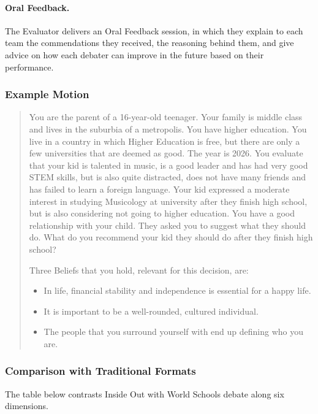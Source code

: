 \documentclass[12pt]{article}
\begin{document}
\paragraph{Oral Feedback.} The Evaluator delivers an Oral Feedback session, in which they explain to each team the commendations they received, the reasoning behind them, and give advice on how each debater can improve in the future based on their performance.

\subsubsection{Example Motion}

\begin{quote}
You are the parent of a 16-year-old teenager. Your family is middle class and lives in the suburbia of a metropolis. You have higher education. You live in a country in which Higher Education is free, but there are only a few universities that are deemed as good. The year is 2026. You evaluate that your kid is talented in music, is a good leader and has had very good STEM skills, but is also quite distracted, does not have many friends and has failed to learn a foreign language. Your kid expressed a moderate interest in studying Musicology at university after they finish high school, but is also considering not going to higher education. You have a good relationship with your child. They asked you to suggest what they should do. What do you recommend your kid they should do after they finish high school?

\medskip

Three Beliefs that you hold, relevant for this decision, are:
\begin{itemize}
    \item In life, financial stability and independence is essential for a happy life.
    \item It is important to be a well-rounded, cultured individual.
    \item The people that you surround yourself with end up defining who you are.
\end{itemize}
\end{quote}

\subsubsection{Comparison with Traditional Formats}

The table below contrasts Inside Out with World Schools debate along six dimensions.
\end{document}
